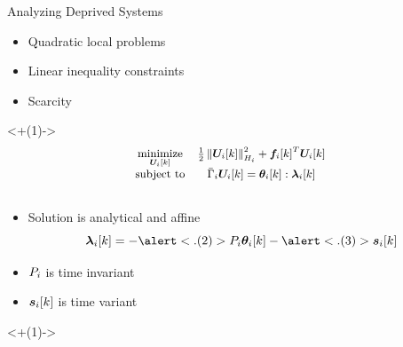 \documentclass[aspectratio=169]{beamer}
\begin{document}
\begin{frame}{Analyzing Deprived Systems}
  \begin{minipage}[t]{.45\textwidth}
    \begin{assumptions}
      \begin{itemize}[<+(1)->]
        \item Quadratic local problems
        \item Linear inequality constraints
        \item Scarcity
      \end{itemize}
    \end{assumptions}
  \end{minipage}
  \hfill
  \begin{minipage}[t]{0.45\textwidth}
    \centering
    \onslide<+(1)->{
      \begin{equation*}
        \small
        \begin{matrix}
          {\minimize\limits_{\vec{U}_{i}[k]}}&{\frac{1}{2}\norm{\vec{U}_{i}[k]}^{2}_{H_{i}} + {\vec{f}_{i}[k]}^{T}\vec{U}_{i}[k]}\\
          \mathrm{subject~ to} & \bar{\Gamma}_{i}\vec{U}_{i}[k] = \thetaik:\lambdaik \\
                                             &\\
        \end{matrix}
      \end{equation*}
    }
  \end{minipage}

  \begin{itemize}[<+(1)->]
    \item Solution is analytical and affine
          \begin{equation*}
            \lambdaik=-\alert<.(2)>{\Plin}\thetaik-\alert<.(3)>{\sik}
          \end{equation*}
  \end{itemize}

  \vspace{-.5cm}
  \hfill
  \begin{minipage}[t]{.45\linewidth}
    \begin{itemize}[<+(1)->]
      \item ${P}_{i}$ is time invariant 
      \item $\boldsymbol{s}_{i}[k]$ is time variant
    \end{itemize}
  \end{minipage}
  \onslide<+(1)->{
  }
\end{frame}
\end{document}
